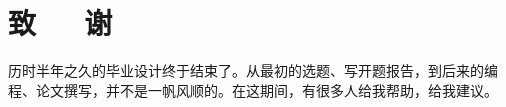 ﻿\renewcommand{\baselinestretch}{1.5}
\fontsize{12pt}{13pt}\selectfont
{}
\chapter*{致~~~谢}

历时半年之久的毕业设计终于结束了。从最初的选题、写开题报告，到后来的编程、论文撰写，并不是一帆风顺的。在这期间，有很多人给我帮助，给我建议。




\clearpage
\endinput